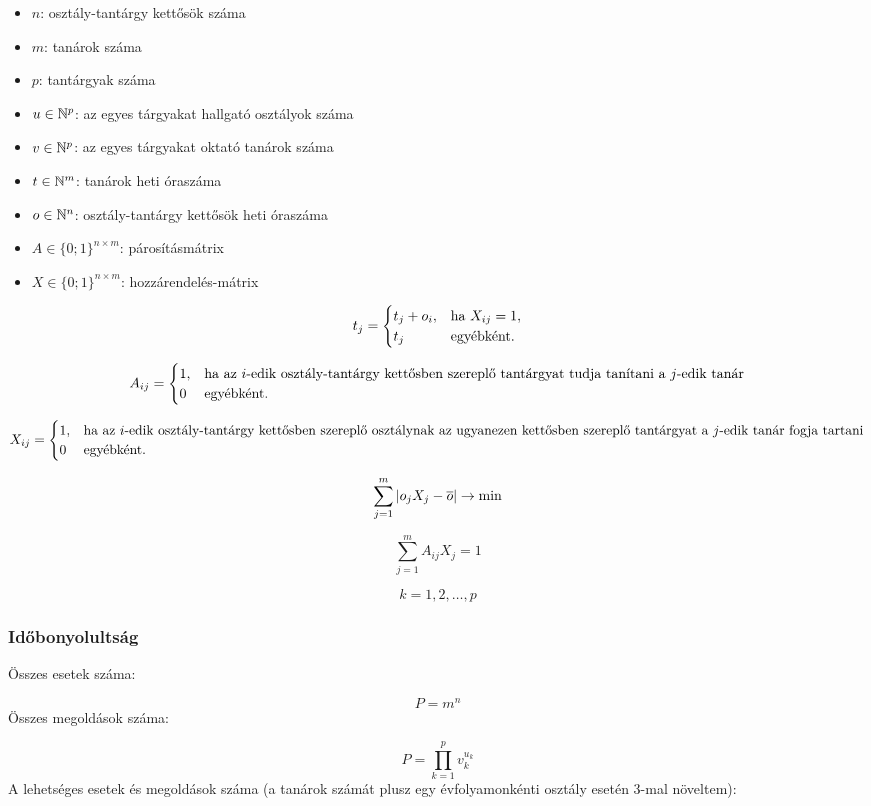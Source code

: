 \documentclass[12pt,a4paper]{report}
\begin{document}
\begin{itemize}
    \item $n$: osztály-tantárgy kettősök száma
    \item $m$: tanárok száma
    \item $p$: tantárgyak száma
    \item $u \in \Bbb{N}^p$: az egyes tárgyakat hallgató osztályok száma
    \item $v \in \Bbb{N}^p$: az egyes tárgyakat oktató tanárok száma
    \item $t \in \Bbb{N}^m$: tanárok heti óraszáma
    \item $o \in \Bbb{N}^n$: osztály-tantárgy kettősök heti óraszáma
    \item $A \in \{0;1\}^{n \times m}$: párosításmátrix
    \item $X \in \{0;1\}^{n \times m}$: hozzárendelés-mátrix
\end{itemize}

\[
t_{j} =
\begin{cases}
t_j+o_i,& \hbox{ha } X_{ij}=1, \\
t_j & \hbox{egyébként}.
\end{cases}
\]

\[
A_{ij} =
\begin{cases}
1, & \hbox{ha az $i$-edik osztály-tantárgy kettősben szereplő tantárgyat tudja tanítani a $j$-edik tanár} \\
0 & \hbox{egyébként}.
\end{cases}
\]

\[
X_{ij} =
\begin{cases}
1, & \hbox{ha az $i$-edik osztály-tantárgy kettősben szereplő osztálynak az ugyanezen kettősben szereplő tantárgyat a $j$-edik tanár fogja tartani} \\
0 & \hbox{egyébként}.
\end{cases}
\]

$$\sum_{j=1}^m \vert o_jX_j-\overline{o}\vert \rightarrow \hbox{min}$$

$$\sum_{j=1}^m A_{ij} X_j=1$$

$$k=1, 2, \ldots, p$$

\subsubsection{Időbonyolultság}

Összes esetek száma:

$$P=m^n$$
Összes megoldások száma:

$$P=\prod_{k=1}^p v_k^{u_k}$$
A lehetséges esetek és megoldások száma (a tanárok számát plusz egy évfolyamonkénti osztály esetén 3-mal növeltem):
\end{document}
